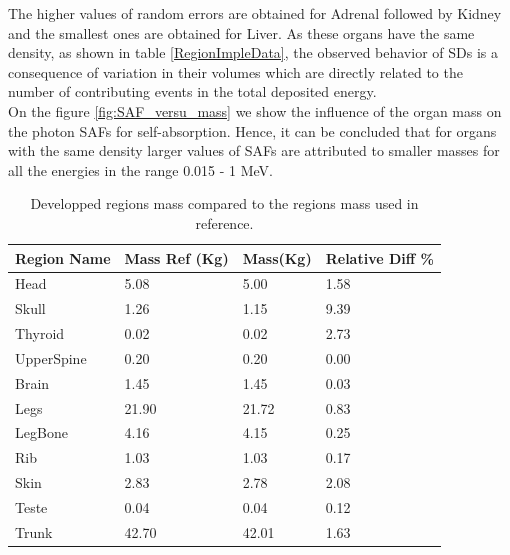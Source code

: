 \documentclass[letterpaper,12pt]{article}
\begin{document}
The higher values of random errors are obtained for Adrenal followed by Kidney and the smallest ones are obtained for Liver. As these organs have the same density, as shown in table \ref{RegionImpleData}, the observed behavior of SDs is a consequence of variation in their volumes which are directly related to the number of contributing events in the total deposited energy. \\

On the figure \ref{fig:SAF_versu_mass} we show the influence of the organ mass on the photon SAFs for self-absorption. Hence, it can be concluded that for organs with the same density larger values of SAFs are attributed to smaller masses for all the energies in the range 0.015 - 1 MeV. 

\begin{table}[H]
\centering
\caption{Developped regions mass compared to the regions mass used in reference.}
\begin{tabular}{llll}
\hline
\textbf{Region Name} & \textbf{Mass Ref (Kg)} & \textbf{Mass(Kg)} & \textbf{Relative Diff \%} \\ \hline
Head                 & 5.08                   & 5.00              & 1.58                   \\ \hline
Skull                & 1.26                   & 1.15              & 9.39                   \\ \hline
Thyroid              & 0.02                   & 0.02              & 2.73                   \\ \hline
UpperSpine           & 0.20                   & 0.20              & 0.00                   \\ \hline
Brain                & 1.45                   & 1.45              & 0.03                   \\ \hline
Legs                 & 21.90                  & 21.72             & 0.83                   \\ \hline
LegBone              & 4.16                   & 4.15              & 0.25                   \\ \hline
Rib                  & 1.03                   & 1.03              & 0.17                   \\ \hline
Skin                 & 2.83                   & 2.78              & 2.08                   \\ \hline
Teste                & 0.04                   & 0.04              & 0.12                   \\ \hline
Trunk                & 42.70                  & 42.01             & 1.63                   \\ \hline

\end{tabular}
\end{table}
\end{document}
